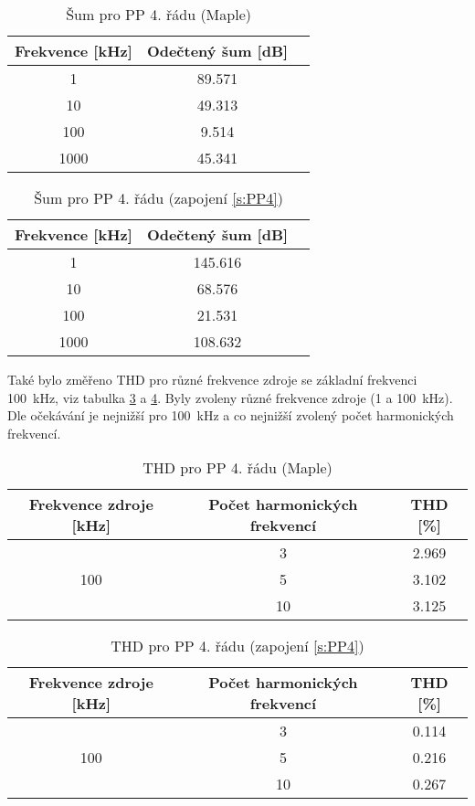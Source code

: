 \begin{table}[h]
\centering
  \begin{tabular}{ | c | c | c |}
    \hline
     Frekvence [kHz] & Odečtený šum [dB] \\ \hline
    1 & 89.571 \\ \hline
    10 & 49.313 \\ \hline
    100 & 9.514 \\ \hline
    1000 & 45.341 \\ \hline
  \end{tabular}
  \caption[Šum pro PP 4. řádu (Maple)]{Šum pro PP 4. řádu (Maple) \label{s:THD1}}
\end{table}
  \begin{table}[h]
\centering
  \begin{tabular}{ | c | c | c |}
    \hline
     Frekvence [kHz] & Odečtený šum [dB] \\ \hline
    1 & 145.616 \\ \hline
    10 & 68.576 \\ \hline
    100 & 21.531 \\ \hline
    1000 & 108.632 \\ \hline
  \end{tabular}
\caption[Šum pro PP 4. řádu]{Šum pro PP 4. řádu (zapojení \ref{s:PP4}) \label{s:THD2}}
\end{table}
\noindent Také bylo změřeno THD pro různé frekvence zdroje se základní frekvenci 100~kHz, viz tabulka \ref{s:THD3} a \ref{s:THD4}. Byly zvoleny různé frekvence zdroje (1 a 100~kHz). Dle očekávání je nejnižší pro 100~kHz a co nejnižší zvolený počet harmonických frekvencí.
\begin{table}[h]
\centering
\renewcommand{\arraystretch}{1.15}
  \begin{tabular}{ | c | c | c |}
    \hline
    Frekvence zdroje [kHz] & Počet harmonických frekvencí & THD [\%] \\ \hline
	\multirow{3}{*}{100} & 3 & 2.969\\& 5 & 3.102 \\& 10 & 3.125 \\ \hline
  \end{tabular}
  \caption[THD pro PP 4. řádu (Maple)]{THD pro PP 4. řádu (Maple) \label{s:THD3}}
\end{table}
\begin{table}[h]
\centering
\renewcommand{\arraystretch}{1.15}
  \begin{tabular}{ | c | c | c |} 
    \hline
     Frekvence zdroje [kHz] & Počet harmonických frekvencí & THD [\%] \\ \hline
	\multirow{3}{*}{100} & 3 & 0.114\\& 5 & 0.216 \\& 10 & 0.267 \\ \hline
  \end{tabular}
  \caption[THD pro PP 4. řádu]{THD pro PP 4. řádu (zapojení \ref{s:PP4}) \label{s:THD4}}
\end{table}
